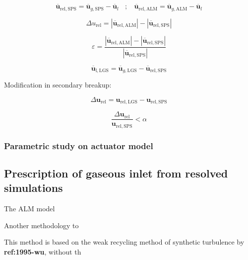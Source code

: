 \begin{equation}
\overline{\textbf{u}}_\mathrm{rel,SPS} = \overline{\textbf{u}}_{g,\mathrm{SPS}} - \overline{\textbf{u}}_l ~~~~ ; ~~~~  \overline{\textbf{u}}_\mathrm{rel,ALM} = \overline{\textbf{u}}_{g,\mathrm{ALM}} - \overline{\textbf{u}}_l
\end{equation}

\begin{equation}
\Delta u_\mathrm{rel} = | \overline{\textbf{u}}_\mathrm{rel,ALM}| - |\overline{\textbf{u}}_\mathrm{rel,SPS}|
\end{equation}

\begin{equation}
\varepsilon =  \frac{|\overline{\textbf{u}}_\mathrm{rel,ALM}| - |\overline{\textbf{u}}_\mathrm{rel,SPS}|}{|\overline{\textbf{u}}_\mathrm{rel,SPS}|} 
\end{equation}

\begin{equation}
\overline{\textbf{u}}_\mathrm{l,LGS} = \overline{\textbf{u}}_{g,\mathrm{LGS}} - \overline{\textbf{u}}_\mathrm{rel,SPS}
\end{equation}

Modification in secondary breakup:

\begin{equation}
\Delta \textbf{u}_\mathrm{rel} = \textbf{u}_\mathrm{rel,LGS} - \textbf{u}_\mathrm{rel,SPS}
\end{equation}

\begin{equation}
\frac{\Delta \textbf{u}_\mathrm{rel}}{\textbf{u}_\mathrm{rel,SPS}} < \alpha 
\end{equation}

\subsubsection{Parametric study on actuator model}


\subsection{Prescription of gaseous inlet from resolved simulations }

The ALM model 

Another methodology to 

This method is based on the weak recycling method of synthetic turbulence by \textbf{ref:1995-wu}, without th



